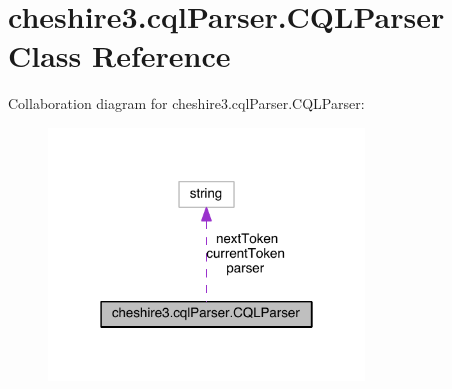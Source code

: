 \hypertarget{classcheshire3_1_1cql_parser_1_1_c_q_l_parser}{\section{cheshire3.\-cql\-Parser.\-C\-Q\-L\-Parser Class Reference}
\label{classcheshire3_1_1cql_parser_1_1_c_q_l_parser}
}


Collaboration diagram for cheshire3.\-cql\-Parser.\-C\-Q\-L\-Parser\-:
\nopagebreak
\begin{figure}[H]
\begin{center}
\leavevmode
\includegraphics[width=238pt]{classcheshire3_1_1cql_parser_1_1_c_q_l_parser__coll__graph}
\end{center}
\end{figure}
